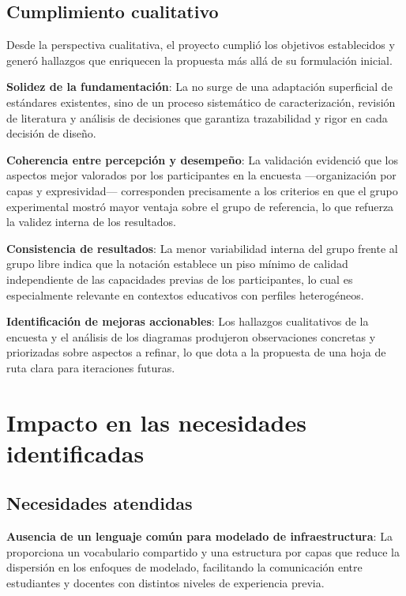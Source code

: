 \subsection{Cumplimiento cualitativo}
\noindent

Desde la perspectiva cualitativa, el proyecto cumplió los objetivos establecidos y generó hallazgos que enriquecen la propuesta más allá de su formulación inicial.

\textbf{Solidez de la fundamentación}: La \NDITI no surge de una adaptación superficial de estándares existentes, sino de un proceso sistemático de caracterización, revisión de literatura y análisis de decisiones que garantiza trazabilidad y rigor en cada decisión de diseño.

\textbf{Coherencia entre percepción y desempeño}: La validación evidenció que los aspectos mejor valorados por los participantes en la encuesta —organización por capas y expresividad— corresponden precisamente a los criterios en que el grupo experimental mostró mayor ventaja sobre el grupo de referencia, lo que refuerza la validez interna de los resultados.

\textbf{Consistencia de resultados}: La menor variabilidad interna del grupo \NDITI frente al grupo libre indica que la notación establece un piso mínimo de calidad independiente de las capacidades previas de los participantes, lo cual es especialmente relevante en contextos educativos con perfiles heterogéneos.

\textbf{Identificación de mejoras accionables}: Los hallazgos cualitativos de la encuesta y el análisis de los diagramas produjeron observaciones concretas y priorizadas sobre aspectos a refinar, lo que dota a la propuesta de una hoja de ruta clara para iteraciones futuras.

\section{Impacto en las necesidades identificadas}
\noindent

\subsection{Necesidades atendidas}
\noindent

\textbf{Ausencia de un lenguaje común para modelado de infraestructura}: La \NDITI proporciona un vocabulario compartido y una estructura por capas que reduce la dispersión en los enfoques de modelado, facilitando la comunicación entre estudiantes y docentes con distintos niveles de experiencia previa.

